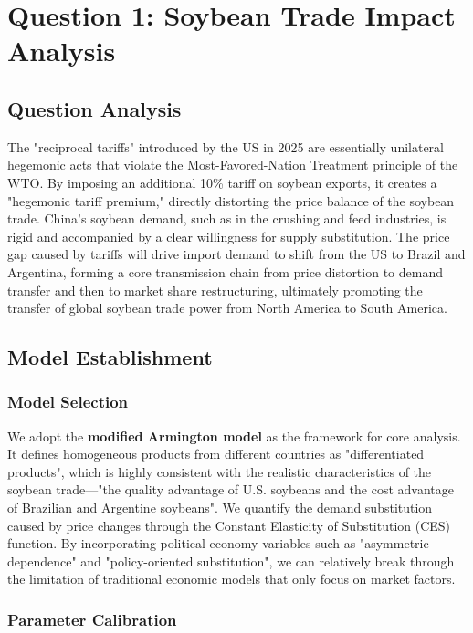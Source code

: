 \documentclass[12pt]{article}
\begin{document}
\section{Question 1: Soybean Trade Impact Analysis}

\subsection{Question Analysis}
The "reciprocal tariffs" introduced by the US in 2025 are essentially unilateral hegemonic acts that violate the Most-Favored-Nation Treatment principle of the WTO. By imposing an additional 10\% tariff on soybean exports, it creates a "hegemonic tariff premium," directly distorting the price balance of the soybean trade. China's soybean demand, such as in the crushing and feed industries, is rigid and accompanied by a clear willingness for supply substitution. The price gap caused by tariffs will drive import demand to shift from the US to Brazil and Argentina, forming a core transmission chain from price distortion to demand transfer and then to market share restructuring, ultimately promoting the transfer of global soybean trade power from North America to South America.

\subsection{Model Establishment}

\subsubsection{Model Selection}
We adopt the \textbf{modified Armington model} as the framework for core analysis. It defines homogeneous products from different countries as "differentiated products", which is highly consistent with the realistic characteristics of the soybean trade—"the quality advantage of U.S. soybeans and the cost advantage of Brazilian and Argentine soybeans". We quantify the demand substitution caused by price changes through the Constant Elasticity of Substitution (CES) function. By incorporating political economy variables such as "asymmetric dependence" and "policy-oriented substitution", we can relatively break through the limitation of traditional economic models that only focus on market factors.

\subsubsection{Parameter Calibration}
\end{document}
